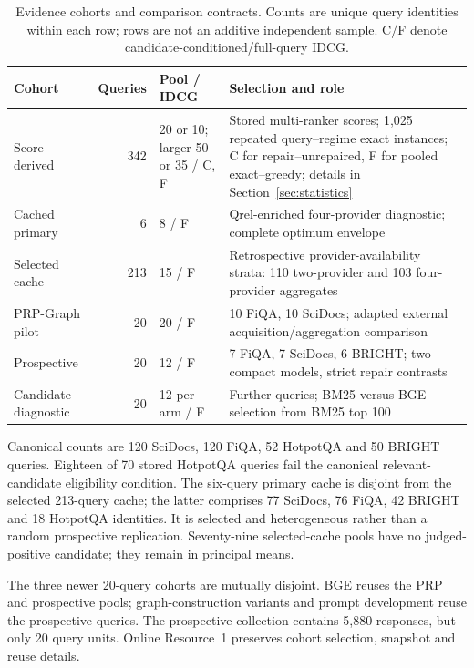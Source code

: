\documentclass[pdflatex,iicol,sn-basic,Numbered]{sn-jnl}
\begin{document}
\begin{table}[t]
\caption{Evidence cohorts and comparison contracts. Counts are unique query identities within each row; rows are not an additive independent sample. C/F denote candidate-conditioned/full-query IDCG.}
\label{tab:cohorts}\papertable
\begin{tabularx}{\linewidth}{@{}L{2.25cm}rL{2.25cm}Y@{}}\toprule
Cohort & Queries & Pool / IDCG & Selection and role \\\midrule
Score-derived &342&20 or 10; larger 50 or 35 / C, F&Stored multi-ranker scores; 1,025 repeated query--regime exact instances; C for repair--unrepaired, F for pooled exact--greedy; details in Section~\ref{sec:statistics} \\\addlinespace
Cached primary &6&8 / F&Qrel-enriched four-provider diagnostic; complete optimum envelope \\\addlinespace
Selected cache &213&15 / F&Retrospective provider-availability strata: 110 two-provider and 103 four-provider aggregates \\\addlinespace
PRP-Graph pilot &20&20 / F&10 FiQA, 10 SciDocs; adapted external acquisition/aggregation comparison \\\addlinespace
Prospective &20&12 / F&7 FiQA, 7 SciDocs, 6 BRIGHT; two compact models, strict repair contrasts \\\addlinespace
Candidate diagnostic &20&12 per arm / F&Further queries; BM25 versus BGE selection from BM25 top 100 \\\bottomrule
\end{tabularx}
\end{table}

Canonical counts are 120 SciDocs, 120 FiQA, 52 HotpotQA and 50 BRIGHT queries. Eighteen of 70 stored HotpotQA queries fail the canonical relevant-candidate eligibility condition. The six-query primary cache is disjoint from the selected 213-query cache; the latter comprises 77 SciDocs, 76 FiQA, 42 BRIGHT and 18 HotpotQA identities. It is selected and heterogeneous rather than a random prospective replication. Seventy-nine selected-cache pools have no judged-positive candidate; they remain in principal means.

The three newer 20-query cohorts are mutually disjoint. BGE reuses the PRP and prospective pools; graph-construction variants and prompt development reuse the prospective queries. The prospective collection contains 5,880 responses, but only 20 query units. Online Resource~1 preserves cohort selection, snapshot and reuse details.
\end{document}
